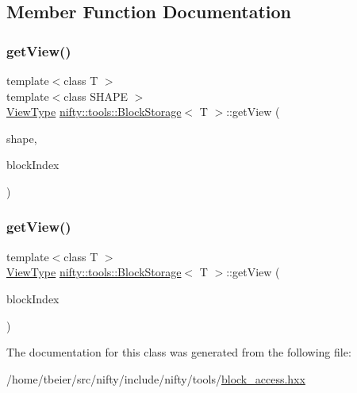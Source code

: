 \subsection{Member Function Documentation}
\mbox{\label{classnifty_1_1tools_1_1BlockStorage_ae9f1e8b14c9281036350c8e6022c5ec0}} 
\subsubsection{\texorpdfstring{get\+View()}{getView()}\hspace{0.1cm}{\footnotesize\ttfamily [1/2]}}
{\footnotesize\ttfamily template$<$class T $>$ \\
template$<$class S\+H\+A\+PE $>$ \\
\hyperlink{classnifty_1_1tools_1_1BlockStorage_afe259433c35f56d01be0b597a696e090}{View\+Type} \hyperlink{classnifty_1_1tools_1_1BlockStorage}{nifty\+::tools\+::\+Block\+Storage}$<$ T $>$\+::get\+View (\begin{DoxyParamCaption}\item[{const S\+H\+A\+PE \&}]{shape,  }\item[{const std\+::size\+\_\+t}]{block\+Index }\end{DoxyParamCaption})\hspace{0.3cm}{\ttfamily [inline]}}

\mbox{\label{classnifty_1_1tools_1_1BlockStorage_a03263a4946397ebea215101c8e53bc24}} 
\subsubsection{\texorpdfstring{get\+View()}{getView()}\hspace{0.1cm}{\footnotesize\ttfamily [2/2]}}
{\footnotesize\ttfamily template$<$class T $>$ \\
\hyperlink{classnifty_1_1tools_1_1BlockStorage_afe259433c35f56d01be0b597a696e090}{View\+Type} \hyperlink{classnifty_1_1tools_1_1BlockStorage}{nifty\+::tools\+::\+Block\+Storage}$<$ T $>$\+::get\+View (\begin{DoxyParamCaption}\item[{const std\+::size\+\_\+t}]{block\+Index }\end{DoxyParamCaption})\hspace{0.3cm}{\ttfamily [inline]}}



The documentation for this class was generated from the following file\+:\begin{DoxyCompactItemize}
\item 
/home/tbeier/src/nifty/include/nifty/tools/\hyperlink{block__access_8hxx}{block\+\_\+access.\+hxx}\end{DoxyCompactItemize}
